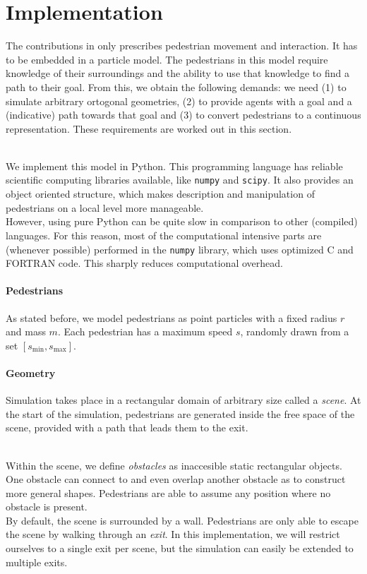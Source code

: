 \documentclass{article}
\begin{document}
\newpage
\section{Implementation}
The contributions in \cite{Narain04} only prescribes pedestrian movement and interaction. It has to be embedded in a particle model. The pedestrians in this model require knowledge of their surroundings and the ability to use that knowledge to find a path to their goal.
From this, we obtain the following demands: we need (1) to simulate arbitrary ortogonal geometries, (2) to provide agents with a goal and a (indicative) path towards that goal and (3) to convert pedestrians to a continuous representation. These requirements are worked out in this section.

\ \\
We implement this model in Python. This programming language has reliable scientific computing libraries available, like \texttt{numpy} and \texttt{scipy}. It also provides an object oriented structure, which makes description and manipulation of pedestrians on a local level more manageable.
\ \\
However, using pure Python can be quite slow in comparison to other (compiled) languages. For this reason, most of the computational intensive parts are (whenever possible) performed in the \texttt{numpy} library, which uses optimized C and FORTRAN code. This sharply reduces computational overhead.
\paragraph{Pedestrians}
As stated before, we model pedestrians as point particles with a fixed radius $r$ and mass $m$. Each pedestrian has a maximum speed $s$, randomly drawn from a set $[s_{\min},s_{\max}]$.
\paragraph{Geometry}
Simulation takes place in a rectangular domain of arbitrary size called a \emph{scene}.
At the start of the simulation, pedestrians are generated inside the free space of the scene, provided with a path that leads them to the exit.

\ \\
Within the scene, we define \emph{obstacles} as inaccesible static rectangular objects. One obstacle can connect to and even overlap another obstacle as to construct more general shapes. Pedestrians are able to assume any position where no obstacle is present.
 \\
By default, the scene is surrounded by a wall. Pedestrians are only able to escape the scene by walking through an \emph{exit}. In this implementation, we will restrict ourselves to a single exit per scene, but the simulation can easily be extended to multiple exits.
\end{document}
